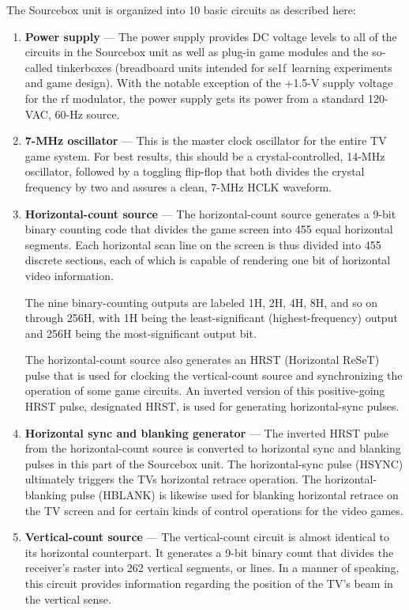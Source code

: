 \documentclass[11pt]{book}              %
\newcommand{\NOT}[1]{$\overline{\mbox{#1}}$}
\begin{document}
The Sourcebox unit is organized into 10 basic circuits as described here:

\begin{enumerate}
\item \textbf{Power supply} — The power supply provides DC voltage levels to all of the circuits in the Sourcebox unit as well as plug-in game modules and the so-called tinkerboxes (breadboard units intended for se1f~learning experiments and game design). With the notable exception of the +1.5-V supply voltage for the rf modulator, the power supply gets its power from a standard 120-VAC, 60-Hz source.

\item \textbf{7-MHz oscillator} — This is the master clock oscillator for the entire TV game system. For best results, this should be a crystal-controlled, 14-MHz oscillator, followed by a toggling flip-flop that both divides the crystal frequency by two and assures a clean, 7-MHz HCLK waveform.

\item \textbf{Horizontal-count source} — The horizontal-count source generates a 9-bit binary counting code that divides the game screen into 455 equal horizontal segments. Each horizontal scan line on the screen is thus divided into 455 discrete sections, each of which is capable of rendering one bit of horizontal video information.

The nine binary-counting outputs are labeled 1H, 2H, 4H, 8H, and so on through 256H, with 1H being the least-significant (highest-frequency) output and 256H being the most-significant output bit.

The horizontal-count source also generates an HRST (Horizontal ReSeT) pulse that is used for clocking the vertical-count source and synchronizing the operation of some game circuits. An inverted version of this positive-going HRST pulse, designated \NOT{HRST}, is used for generating horizontal-sync pulses.

\item \textbf{Horizontal sync and blanking generator} — The inverted HRST pulse from the horizontal-count source is converted to horizontal sync and blanking pulses in this part of the Sourcebox unit. The horizontal-sync pulse (HSYNC) ultimately triggers the TVs horizontal retrace operation. The horizontal-blanking pulse (HBLANK) is likewise used for blanking horizontal retrace on the TV screen and for certain kinds of control operations for the video games.

\item \textbf{Vertical-count source} — The vertical-count circuit is almost identical to its horizontal counterpart. It generates a 9-bit binary count that divides the receiver’s raster into 262 vertical segments, or lines. In a manner of speaking, this circuit provides information regarding the position of the TV’s beam in the vertical sense.


\end{enumerate}
\end{document}
